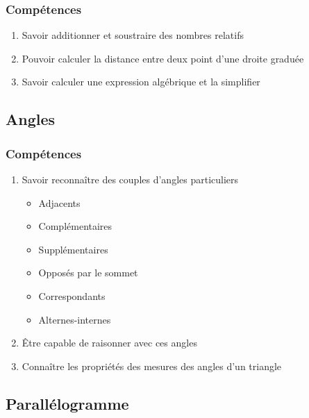  \subsubsection*{Compétences}
\begin{enumerate}
	\item Savoir additionner et soustraire des nombres relatifs
	\item Pouvoir calculer la distance entre deux point d'une droite graduée 
	\item Savoir calculer une expression algébrique et la simplifier
\end{enumerate}

\subsection{Angles}\label{ch_5_angles}

\subsubsection*{Compétences}

\begin{enumerate}
	\item Savoir reconnaître des couples d'angles particuliers
	\begin{itemize}
		\item Adjacents
		\item Complémentaires
		\item Supplémentaires
		\item Opposés par le sommet
		\item Correspondants
		\item Alternes-internes
	\end{itemize}
	\item Être capable de raisonner avec ces angles
	\item Connaître les propriétés des mesures des angles d'un triangle
\end{enumerate}

\subsection{Parallélogramme}\label{ch_5_para}


